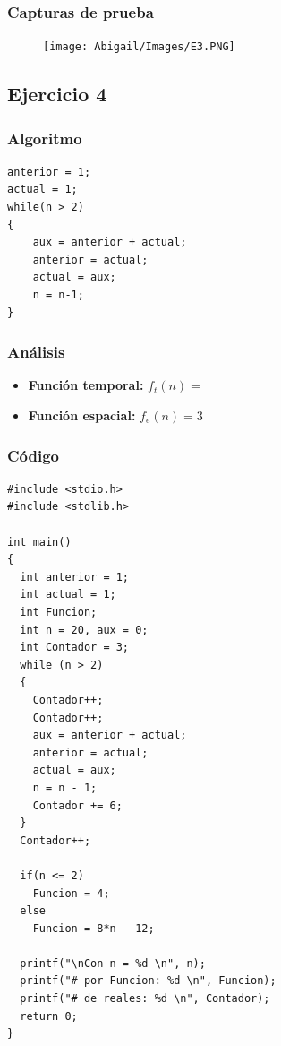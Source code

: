 \documentclass[12pt]{article}
\begin{document}
    		\subsubsection{Capturas de prueba}
				\begin{figure}[h!]
	                \centering
	                \texttt{[image: Abigail/Images/E3.PNG]}
	 		    \end{figure} 

	    \subsection{Ejercicio 4}
	    	\subsubsection{Algoritmo}
	        \begin{lstlisting}[style=Java]
anterior = 1;
actual = 1;
while(n > 2)
{
	aux = anterior + actual;
	anterior = actual;
	actual = aux;
	n = n-1;
}
    		\end{lstlisting}
    		\subsubsection{Análisis}
    			\begin{itemize}
    				\item[\Checkmark] \textbf{Función temporal:} $f_{t}(n) =  $
    				\item[\Checkmark] \textbf{Función espacial:} $f_{e}(n) = 3$
    			\end{itemize}
    		\subsubsection{Código}
    		\begin{lstlisting}[style=Java]
#include <stdio.h>
#include <stdlib.h>

int main() 
{
  int anterior = 1;
  int actual = 1;
  int Funcion; 
  int n = 20, aux = 0;
  int Contador = 3;
  while (n > 2) 
  {
    Contador++;
    Contador++;
    aux = anterior + actual;
    anterior = actual;
    actual = aux;
    n = n - 1;
    Contador += 6;
  }
  Contador++;

  if(n <= 2)
    Funcion = 4;
  else
    Funcion = 8*n - 12;

  printf("\nCon n = %d \n", n); 
  printf("# por Funcion: %d \n", Funcion);
  printf("# de reales: %d \n", Contador);
  return 0;
}
	   		\end{lstlisting}
\end{document}
